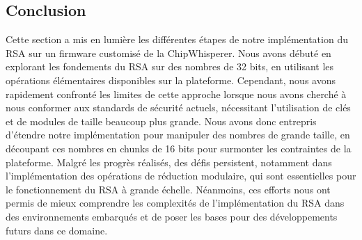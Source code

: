 \subsection{Conclusion}
Cette section a mis en lumière les différentes étapes de notre implémentation du RSA sur un firmware customisé de la ChipWhisperer. Nous avons débuté en explorant les fondements du RSA sur des nombres de 32 bits, en utilisant les opérations élémentaires disponibles sur la plateforme. Cependant, nous avons rapidement confronté les limites de cette approche lorsque nous avons cherché à nous conformer aux standards de sécurité actuels, nécessitant l'utilisation de clés et de modules de taille beaucoup plus grande. Nous avons donc entrepris d'étendre notre implémentation pour manipuler des nombres de grande taille, en découpant ces nombres en chunks de 16 bits pour surmonter les contraintes de la plateforme. Malgré les progrès réalisés, des défis persistent, notamment dans l'implémentation des opérations de réduction modulaire, qui sont essentielles pour le fonctionnement du RSA à grande échelle. Néanmoins, ces efforts nous ont permis de mieux comprendre les complexités de l'implémentation du RSA dans des environnements embarqués et de poser les bases pour des développements futurs dans ce domaine.